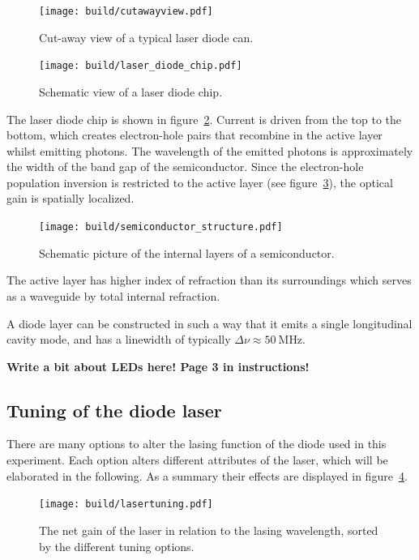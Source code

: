 \begin{figure}[ht]
  \centering
  \texttt{[image: build/cutawayview.pdf]}
  \caption{Cut-away view of a typical laser diode can\cite{anleitung}.}%
  \label{fig:cutawayview}
\end{figure}

\begin{figure}[ht]
  \centering
  \texttt{[image: build/laser\_diode\_chip.pdf]}
  \caption{Schematic view of a laser diode chip\cite{anleitung}.}%
  \label{fig:laser_diode_chip}
\end{figure}

The laser diode chip is shown in figure~\ref{fig:laser_diode_chip}.
Current is driven from the top to the bottom, which creates electron-hole pairs that
recombine in the active layer whilst emitting photons.
The wavelength of the emitted photons is approximately the width of the band gap of the semiconductor.
Since the electron-hole population inversion is restricted to the active layer (see
figure~\ref{fig:semiconductor_structure}),
the optical gain is spatially localized.

\begin{figure}[ht]
  \centering
  \texttt{[image: build/semiconductor\_structure.pdf]}
  \caption{Schematic picture of the internal layers of a semiconductor\cite{anleitung}.}%
  \label{fig:semiconductor_structure}
\end{figure}

The active layer has higher index of refraction than its surroundings
which serves as a waveguide by total internal refraction.

A diode layer can be constructed in such a way that it emits a single longitudinal cavity mode,
and has a linewidth of typically $\Delta \nu \approx \SI{50}{\mega\hertz}$.

\textbf{Write a bit about LEDs here! Page 3 in instructions!}

\subsection{Tuning of the diode laser}\label{tuning-of-the-diode-laser}
There are many options to alter the lasing function of the diode used in this experiment.
Each option alters different attributes of the laser, which will be elaborated in the following.
As a summary their effects are displayed in figure~\ref{fig:lasertuning}.
\begin{figure}[ht]
  \centering
  \texttt{[image: build/lasertuning.pdf]}
  \caption{The net gain of the laser in relation to the lasing wavelength, sorted by the different
  tuning options\cite{anleitung}.}%
  \label{fig:lasertuning}
\end{figure}

